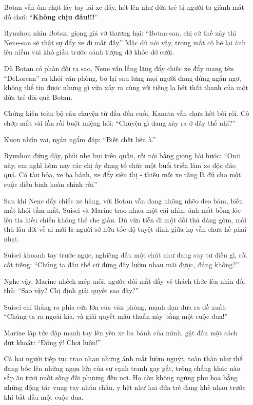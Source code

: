 \documentclass[../main.tex]{subfiles}
\begin{document}
Botan vẫn ôm chặt lấy tay lái xe đẩy, hét lên như đứa trẻ bị người ta giành mất đồ chơi: ``\textbf{Không chịu đâu!!!}''

Ryuuhou nhìn Botan, giọng giả vờ thương hại: ``Botan-san, chị cứ thế này thì Nene-san sẽ thật sự đẩy xe đi mất đấy.'' Mặc dù nói vậy, trong mắt cô bé lại ánh lên niềm vui khó giấu trước cảnh tượng dở khóc dở cười.

Dù Botan có phản đối ra sao, Nene vẫn lẳng lặng đẩy chiếc xe đẩy mang tên ``DeLorean'' ra khỏi văn phòng, bỏ lại sau lưng mọi người đang đứng ngẩn ngơ, không thể tin được những gì vừa xảy ra cùng với tiếng la hét thất thanh của một đứa trẻ đòi quà Botan.


Chứng kiến toàn bộ câu chuyện từ đầu đến cuối, Kanata vẫn chưa hết bối rối. Cô chớp mắt vài lần rồi buột miệng hỏi: ``Chuyện gì đang xảy ra ở đây thế nhỉ?''

Kuon nhún vai, ngán ngẩm đáp: ``Biết chết liền à.''

Ryuuhou đứng dậy, phủi nhẹ bụi trên quần, rồi nói bằng giọng hài hước: ``Onii này, em nghĩ hôm nay các chị ấy đang tổ chức một buổi triển lãm xe độc đáo quá. Có tàu hỏa, xe ba bánh, xe đẩy siêu thị - thiếu mỗi xe tăng là đủ cho một cuộc diễu binh hoàn chỉnh rồi.''

Sau khi Nene đẩy chiếc xe hàng, với Botan vẫn đang nhõng nhẽo đeo bám, biến mất khỏi tầm mắt, Suisei và Marine trao nhau một cái nhìn, ánh mắt bỗng lóe lên tia hiếu chiến không thể che giấu. Dù vừa tiễn đi một đối thủ đáng gờm, mối thù lâu đời về ai mới là người sở hữu tốc độ tuyệt đỉnh giữa họ vẫn chưa hề phai nhạt.

Suisei khoanh tay trước ngực, nghiêng đầu một chút như đang suy tư điều gì, rồi cất tiếng: ``Chúng ta đâu thể cứ đứng đây lườm nhau mãi được, đúng không?''

Nghe vậy, Marine nhếch mép môi, ngước đôi mắt đầy vẻ thách thức lên nhìn đối thủ: ``Sao vậy? Chị định giải quyết sao đây?''

Suisei chỉ thẳng ra phía cửa lớn của văn phòng, mạnh dạn đưa ra đề xuất: ``Chúng ta ra ngoài kia, và giải quyết mâu thuẫn này bằng một cuộc đua!''

Marine lập tức đập mạnh tay lên yên xe ba bánh của mình, gật đầu một cách dứt khoát: ``Đồng ý! Chơi luôn!''

Cả hai người tiếp tục trao nhau những ánh mắt lườm nguýt, toàn thân như thể đang bốc lên những ngọn lửa của sự cạnh tranh gay gắt, trông chẳng khác nào sắp ăn tươi nuốt sống đối phương đến nơi. Họ còn không ngừng phụ họa bằng những động tác vung tay nhún chân, y hệt như hai đứa trẻ đang khè nhau trước khi bắt đầu một cuộc đua.
\end{document}
